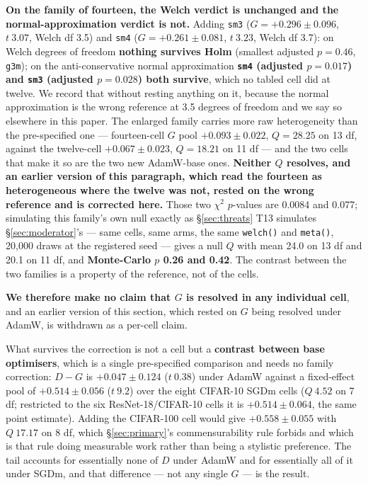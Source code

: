 \documentclass[10pt,letterpaper]{article}
\newcommand{\Dstat}{D}                         %
\newcommand{\Gstat}{G}                         %
\newcommand{\arm}[1]{\texttt{#1}}
\begin{document}
\textbf{On the family of fourteen, the Welch verdict is unchanged and the normal-approximation
verdict is not.} Adding \arm{sm3} ($\Gstat = +0.296 \pm 0.096$, $t\ 3.07$, Welch df 3.5) and
\arm{sm4} ($\Gstat = +0.261 \pm 0.081$, $t\ 3.23$, Welch df 3.7): on Welch degrees of freedom
\textbf{nothing survives Holm} (smallest adjusted $p = 0.46$, \arm{g3m}); on the
anti-conservative normal approximation \textbf{\arm{sm4} (adjusted $p = 0.017$) and \arm{sm3}
(adjusted $p = 0.028$) both survive}, which no tabled cell did at twelve. We record that without
resting anything on it, because the normal approximation is the wrong reference at 3.5 degrees of
freedom and we say so elsewhere in this paper. The enlarged family carries more raw heterogeneity than
the pre-specified one --- fourteen-cell $\Gstat$ pool $+0.093 \pm 0.022$, $Q = 28.25$ on 13 df,
against the twelve-cell $+0.067 \pm 0.023$, $Q = 18.21$ on 11 df --- and the two cells that make
it so are the two new AdamW-base ones. \textbf{Neither $Q$ resolves, and an earlier version of
this paragraph, which read the fourteen as heterogeneous where the twelve was not, rested on the
wrong reference and is corrected here.} Those two $\chi^2$ $p$-values are 0.0084 and 0.077;
simulating this family's own null exactly as \S\ref{sec:threats} T13 simulates
\S\ref{sec:moderator}'s --- same cells, same arms, the same \texttt{welch()} and
\texttt{meta()}, 20{,}000 draws at the registered seed --- gives a null $Q$ with mean 24.0 on
13 df and 20.1 on 11 df, and \textbf{Monte-Carlo $p$ 0.26 and 0.42}. The contrast between the
two families is a property of the reference, not of the cells.

\textbf{We therefore make no claim
that $\Gstat$ is resolved in any individual cell}, and an earlier version of this section, which
rested on $\Gstat$ being resolved under AdamW, is withdrawn as a per-cell claim.

What survives the correction is not a cell but a \textbf{contrast between base optimisers}, which
is a single pre-specified comparison and needs no family correction: $\Dstat - \Gstat$ is
$+0.047 \pm 0.124$ ($t\ 0.38$) under AdamW against a fixed-effect pool of
$\mathbf{+0.514 \pm 0.056}$ ($t\ 9.2$) over the eight CIFAR-10 SGDm cells ($Q\ 4.52$ on 7 df;
restricted to the six ResNet-18/CIFAR-10 cells it is $+0.514 \pm 0.064$, the same point estimate).
Adding the CIFAR-100 cell would give $+0.558 \pm 0.055$ with $Q\ 17.17$ on 8 df, which
\S\ref{sec:primary}'s commensurability rule forbids and which is that rule doing measurable work
rather than being a stylistic preference. The tail accounts for essentially none of $\Dstat$ under
AdamW and for essentially all of it under SGDm, and that difference --- not any single $\Gstat$
--- is the result.
\end{document}
